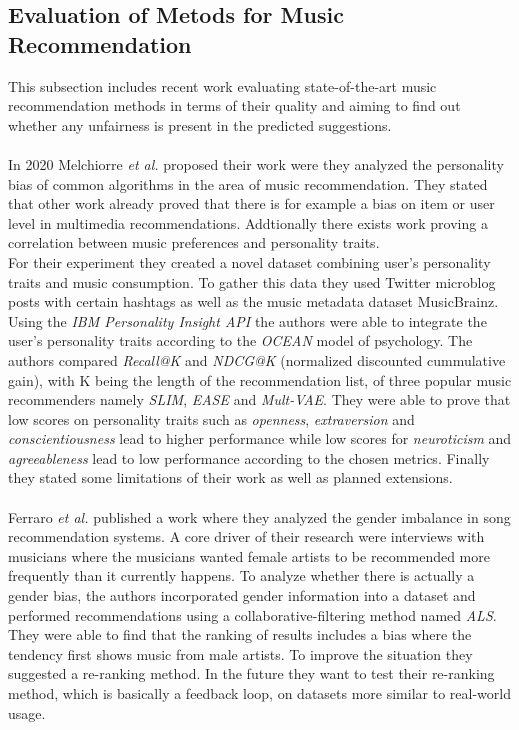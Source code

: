 \documentclass[runningheads,a4paper]{llncs}
\begin{document}
\subsection{Evaluation of Metods for Music Recommendation} 
This subsection includes recent work evaluating state-of-the-art music recommendation methods
in terms of their quality and aiming to find out whether any unfairness is present in the predicted suggestions.\\
\\
In 2020 Melchiorre \textit{et al.} proposed their work were they analyzed the personality bias of common algorithms in the area of music recommendation.
They stated that other work already proved that there is for example a bias on item or user level in multimedia recommendations. 
Addtionally there exists work proving a correlation between music preferences and personality traits.\\
For their experiment they created a novel dataset combining user's personality traits and music consumption.
To gather this data they used Twitter microblog posts with certain hashtags as well as the music metadata dataset MusicBrainz. 
Using the \textit{IBM Personality Insight API} the authors were able to integrate the user's personality traits according to the \textit{OCEAN} model of psychology.
The authors compared \textit{Recall@K} and \textit{NDCG@K} (normalized discounted cummulative gain), with K being the length of the recommendation list, of three popular music recommenders namely \textit{SLIM}, \textit{EASE} and \textit{Mult-VAE}.
They were able to prove that low scores on personality traits such as \textit{openness}, \textit{extraversion} and \textit{conscientiousness} lead to higher performance
while low scores for \textit{neuroticism} and \textit{agreeableness} lead to low performance according to the chosen metrics. 
Finally they stated some limitations of their work as well as planned extensions. \cite{melchiorre2020personality}\\
\\
Ferraro \textit{et al.} published a work where they analyzed the gender imbalance in song recommendation systems. A core driver of 
their research were interviews with musicians where the musicians wanted female artists to be recommended more frequently than it currently happens.
To analyze whether there is actually a gender bias, the authors incorporated gender information into a dataset and
performed recommendations using a collaborative-filtering method named \textit{ALS}.
They were able to find that the ranking of results includes a bias where the tendency first shows music from male artists. 
To improve the situation they suggested a re-ranking method. In the future they want to test their re-ranking method, which is basically a feedback loop, on datasets more similar to real-world usage. \cite{ferraro2021break}
\end{document}
